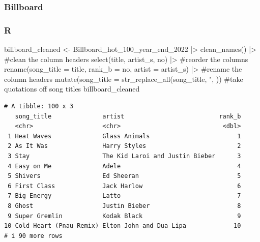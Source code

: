 \documentclass[
  letterpaper,
  DIV=11,
  numbers=noendperiod]{scrreprt}
\newenvironment{Shaded}{\begin{snugshade}}{\end{snugshade}}
\newcommand{\AttributeTok}[1]{\textcolor[rgb]{0.40,0.45,0.13}{#1}}
\newcommand{\CommentTok}[1]{\textcolor[rgb]{0.37,0.37,0.37}{#1}}
\newcommand{\FunctionTok}[1]{\textcolor[rgb]{0.28,0.35,0.67}{#1}}
\newcommand{\NormalTok}[1]{\textcolor[rgb]{0.00,0.23,0.31}{#1}}
\newcommand{\OtherTok}[1]{\textcolor[rgb]{0.00,0.23,0.31}{#1}}
\newcommand{\SpecialCharTok}[1]{\textcolor[rgb]{0.37,0.37,0.37}{#1}}
\newcommand{\StringTok}[1]{\textcolor[rgb]{0.13,0.47,0.30}{#1}}
\begin{document}
\subsubsection*{Billboard}\label{billboard}

\subsubsection{R}

\begin{Shaded}
\begin{Highlighting}[]
\NormalTok{billboard\_cleaned }\OtherTok{\textless{}{-}}\NormalTok{ Billboard\_hot\_100\_year\_end\_2022 }\SpecialCharTok{|\textgreater{}}
  \FunctionTok{clean\_names}\NormalTok{() }\SpecialCharTok{|\textgreater{}} \CommentTok{\#clean the column headers}
  \FunctionTok{select}\NormalTok{(title, artist\_s, no) }\SpecialCharTok{|\textgreater{}} \CommentTok{\#reorder the columns}
  \FunctionTok{rename}\NormalTok{(}\AttributeTok{song\_title =}\NormalTok{ title, }\AttributeTok{rank\_b =}\NormalTok{ no, }\AttributeTok{artist =}\NormalTok{ artist\_s) }\SpecialCharTok{|\textgreater{}} \CommentTok{\#rename the column headers}
  \FunctionTok{mutate}\NormalTok{(}\AttributeTok{song\_title =} \FunctionTok{str\_replace\_all}\NormalTok{(song\_title, }\StringTok{\textquotesingle{}"\textquotesingle{}}\NormalTok{, }\StringTok{\textquotesingle{}\textquotesingle{}}\NormalTok{)) }\CommentTok{\#take quotations off song titles}
\NormalTok{billboard\_cleaned}
\end{Highlighting}
\end{Shaded}

\begin{verbatim}
# A tibble: 100 x 3
   song_title              artist                          rank_b
   <chr>                   <chr>                            <dbl>
 1 Heat Waves              Glass Animals                        1
 2 As It Was               Harry Styles                         2
 3 Stay                    The Kid Laroi and Justin Bieber      3
 4 Easy on Me              Adele                                4
 5 Shivers                 Ed Sheeran                           5
 6 First Class             Jack Harlow                          6
 7 Big Energy              Latto                                7
 8 Ghost                   Justin Bieber                        8
 9 Super Gremlin           Kodak Black                          9
10 Cold Heart (Pnau Remix) Elton John and Dua Lipa             10
# i 90 more rows
\end{verbatim}
\end{document}
